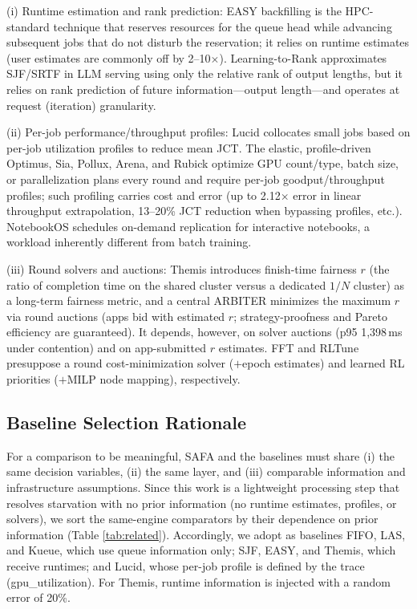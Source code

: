 \documentclass{ieeetj}
\begin{document}
(i) Runtime estimation and rank prediction: EASY backfilling\cite{mualem2001backfilling} is the HPC-standard technique that reserves resources for the queue head while advancing subsequent jobs that do not disturb the reservation; it relies on runtime estimates (user estimates are commonly off by 2--10$\times$). Learning-to-Rank\cite{fu2024efficient} approximates SJF/SRTF in LLM serving using only the relative rank of output lengths, but it relies on rank prediction of future information---output length---and operates at request (iteration) granularity.

(ii) Per-job performance/throughput profiles: Lucid\cite{b5} collocates small jobs based on per-job utilization profiles to reduce mean JCT. The elastic, profile-driven Optimus\cite{peng2018optimus}, Sia\cite{b4}, Pollux\cite{qiao2021pollux}, Arena\cite{arena2026}, and Rubick\cite{rubick2025} optimize GPU count/type, batch size, or parallelization plans every round and require per-job goodput/throughput profiles; such profiling carries cost and error (up to 2.12$\times$ error in linear throughput extrapolation, 13--20\% JCT reduction when bypassing profiles, etc.\cite{schedmate2025}). NotebookOS\cite{notebookos2026} schedules on-demand replication for interactive notebooks, a workload inherently different from batch training.

(iii) Round solvers and auctions: Themis\cite{mahajan2020themis} introduces finish-time fairness $r$ (the ratio of completion time on the shared cluster versus a dedicated $1/N$ cluster) as a long-term fairness metric, and a central ARBITER minimizes the maximum $r$ via round auctions (apps bid with estimated $r$; strategy-proofness and Pareto efficiency are guaranteed). It depends, however, on solver auctions (p95 1,398\,ms under contention) and on app-submitted $r$ estimates. FFT\cite{fft2025} and RLTune\cite{rltune2025} presuppose a round cost-minimization solver ($+$epoch estimates) and learned RL priorities ($+$MILP node mapping), respectively.

\subsection{Baseline Selection Rationale}\label{baseline-rationale}
For a comparison to be meaningful, SAFA and the baselines must share (i) the same decision variables, (ii) the same layer, and (iii) comparable information and infrastructure assumptions. Since this work is a lightweight processing step that resolves starvation with no prior information (no runtime estimates, profiles, or solvers), we sort the same-engine comparators by their dependence on prior information (Table \ref{tab:related}). Accordingly, we adopt as baselines FIFO, LAS, and Kueue, which use queue information only; SJF, EASY, and Themis, which receive runtimes; and Lucid, whose per-job profile is defined by the trace (gpu\_utilization). For Themis, runtime information is injected with a random error of 20\%.
\end{document}
